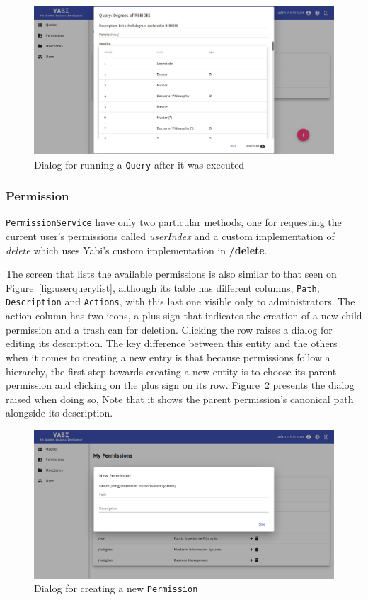 \begin{figure}
  \centering
  \includegraphics[width=.8\textwidth]{images/screenshots/query/query-post-run}
  \caption{Dialog for running a \texttt{Query} after it was executed}\label{fig:querypostrun}
\end{figure}


\subsubsection{Permission}
\texttt{PermissionService} have only two particular methods, one for requesting the current user's permissions called \textit{userIndex} and a custom implementation of \textit{delete} which uses \gls{Yabi}'s custom implementation in \textbf{/delete}.

The screen that lists the available permissions is also similar to that seen on Figure~\ref{fig:userquerylist}, although its table has different columns, \texttt{Path}, \texttt{Description} and \texttt{Actions}, with this last one visible only to administrators. The action column has two icons, a plus sign that indicates the creation of a new child permission and a trash can for deletion. Clicking the row raises a dialog for editing its description. The key difference between this entity and the others when it comes to creating a new entry is that because permissions follow a hierarchy, the first step towards creating a new entity is to choose its parent permission and clicking on the plus sign on its row. Figure~\ref{fig:permissionnew} presents the dialog raised when doing so, Note that it shows the parent permission's canonical path alongside its description.

\begin{figure}
  \centering
  \includegraphics[width=.8\textwidth]{images/screenshots/permission/permission-new}
  \caption{Dialog for creating a new \texttt{Permission}}\label{fig:permissionnew}
\end{figure}

